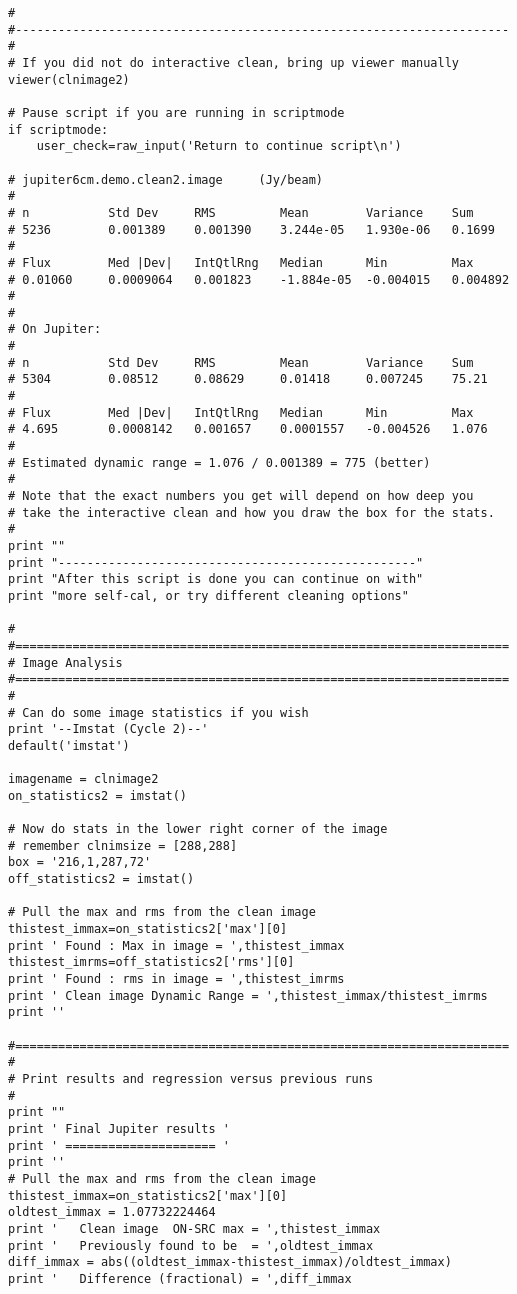 \begin{verbatim}
#
#---------------------------------------------------------------------
#
# If you did not do interactive clean, bring up viewer manually
viewer(clnimage2)

# Pause script if you are running in scriptmode
if scriptmode:
    user_check=raw_input('Return to continue script\n')

# jupiter6cm.demo.clean2.image     (Jy/beam)
# 
# n           Std Dev     RMS         Mean        Variance    Sum
# 5236        0.001389    0.001390    3.244e-05   1.930e-06   0.1699    
# 
# Flux        Med |Dev|   IntQtlRng   Median      Min         Max
# 0.01060     0.0009064   0.001823    -1.884e-05  -0.004015   0.004892  
# 
# 
# On Jupiter:
# 
# n           Std Dev     RMS         Mean        Variance    Sum
# 5304        0.08512     0.08629     0.01418     0.007245    75.21     
# 
# Flux        Med |Dev|   IntQtlRng   Median      Min         Max
# 4.695       0.0008142   0.001657    0.0001557   -0.004526   1.076     
#
# Estimated dynamic range = 1.076 / 0.001389 = 775 (better)
#
# Note that the exact numbers you get will depend on how deep you
# take the interactive clean and how you draw the box for the stats.
#
print ""
print "--------------------------------------------------"
print "After this script is done you can continue on with"
print "more self-cal, or try different cleaning options"

#
#=====================================================================
# Image Analysis
#=====================================================================
#
# Can do some image statistics if you wish
print '--Imstat (Cycle 2)--'
default('imstat')

imagename = clnimage2
on_statistics2 = imstat()

# Now do stats in the lower right corner of the image
# remember clnimsize = [288,288]
box = '216,1,287,72'
off_statistics2 = imstat()

# Pull the max and rms from the clean image
thistest_immax=on_statistics2['max'][0]
print ' Found : Max in image = ',thistest_immax
thistest_imrms=off_statistics2['rms'][0]
print ' Found : rms in image = ',thistest_imrms
print ' Clean image Dynamic Range = ',thistest_immax/thistest_imrms
print ''

#=====================================================================
#
# Print results and regression versus previous runs
#
print ""
print ' Final Jupiter results '
print ' ===================== '
print ''
# Pull the max and rms from the clean image
thistest_immax=on_statistics2['max'][0]
oldtest_immax = 1.07732224464
print '   Clean image  ON-SRC max = ',thistest_immax
print '   Previously found to be  = ',oldtest_immax
diff_immax = abs((oldtest_immax-thistest_immax)/oldtest_immax)
print '   Difference (fractional) = ',diff_immax


\end{verbatim}

